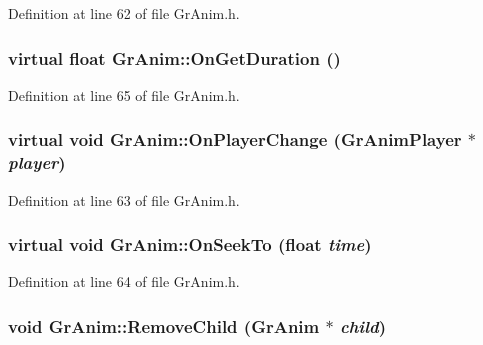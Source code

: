 Definition at line 62 of file GrAnim.h.\hypertarget{class_gr_anim_a3de284e428631ca76ddf0cc8af9b787}{
\subsubsection[{OnGetDuration}]{\setlength{\rightskip}{0pt plus 5cm}virtual float GrAnim::OnGetDuration ()}}
\label{class_gr_anim_a3de284e428631ca76ddf0cc8af9b787}




Definition at line 65 of file GrAnim.h.\hypertarget{class_gr_anim_9bf82e4b036b8a2649745dc993158067}{
\subsubsection[{OnPlayerChange}]{\setlength{\rightskip}{0pt plus 5cm}virtual void GrAnim::OnPlayerChange ({\bf GrAnimPlayer} $\ast$ {\em player})}}
\label{class_gr_anim_9bf82e4b036b8a2649745dc993158067}




Definition at line 63 of file GrAnim.h.\hypertarget{class_gr_anim_8debb19e5a8a60ae9a4f2d4a95042108}{
\subsubsection[{OnSeekTo}]{\setlength{\rightskip}{0pt plus 5cm}virtual void GrAnim::OnSeekTo (float {\em time})}}
\label{class_gr_anim_8debb19e5a8a60ae9a4f2d4a95042108}




Definition at line 64 of file GrAnim.h.\hypertarget{class_gr_anim_812d2e9d6246923c1c6d3d93b3444a48}{
\subsubsection[{RemoveChild}]{\setlength{\rightskip}{0pt plus 5cm}void GrAnim::RemoveChild ({\bf GrAnim} $\ast$ {\em child})}}
\label{class_gr_anim_812d2e9d6246923c1c6d3d93b3444a48}




